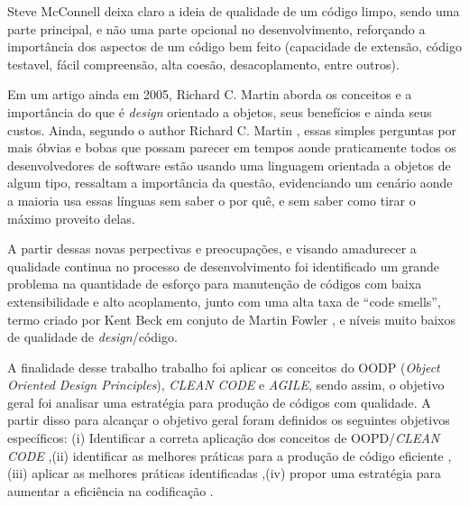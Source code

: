 \documentclass[12pt]{article}
\begin{document}
Steve McConnell \cite{CODE_COMPLETE_2} deixa claro a ideia de qualidade de um código limpo, sendo uma parte principal, e não uma parte opcional no desenvolvimento, reforçando a importância dos aspectos de um código bem feito (capacidade de extensão, código testavel, fácil compreensão, alta coesão, desacoplamento, entre outros).

Em um artigo ainda em 2005, Richard C. Martin \cite{THE_PRINCIPLES_OF_OOD} aborda os conceitos e a importância do que é \textit{design} orientado a objetos, seus benefícios e ainda seus custos.
Ainda, segundo o author Richard C. Martin \cite{THE_PRINCIPLES_OF_OOD}, essas simples perguntas por mais óbvias e bobas que possam parecer em tempos aonde praticamente todos os desenvolvedores de software estão usando uma linguagem orientada a objetos de algum tipo, ressaltam a importância da questão, evidenciando um cenário aonde a maioria usa essas línguas sem saber o por quê, e sem saber como tirar o máximo proveito delas.
	 

A partir dessas novas perpectivas e preocupações, e visando amadurecer a qualidade continua no processo de desenvolvimento foi identificado um grande problema na quantidade de esforço para manutenção de códigos com baixa extensibilidade e alto acoplamento, junto com uma alta taxa de “code smells”, termo criado por Kent Beck em conjuto de Martin Fowler \cite{MARTIN_FOWLER_REFACTORING}, e níveis muito baixos de qualidade de \textit{design}/código.



A finalidade desse trabalho trabalho foi aplicar os conceitos do OODP (\textit{Object Oriented Design Principles}), \textit{CLEAN CODE} e \textit{AGILE}, sendo assim, o objetivo geral foi analisar uma estratégia para produção de códigos com qualidade. A partir disso para alcançar o objetivo geral foram definidos os seguintes objetivos específicos: 
(i) Identificar a correta aplicação dos conceitos de OOPD/\textit{CLEAN CODE}
,(ii) identificar as melhores práticas para a produção de código eficiente
,(iii) aplicar as melhores práticas identificadas
,(iv) propor uma estratégia para aumentar a eficiência na codificação
.
\end{document}
